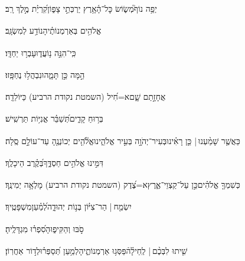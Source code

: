 \documentclass[12pt]{article}
\newcommand{\loc}[1]{\textsuperscript{\locf{#1}}}
\begin{document}
{\loc{ ג}~}‏יְפֵ֥ה נוֹף֮{\hfill}מְשׂ֢וֹשׂ כׇּל־הָ֫אָ֥רֶץ\newline\hspace*{.5em} יַרְכְּתֵ֣י צָפ֑וֹן{\hfill}קִ֝רְיַ֗ת מֶ֣לֶךְ רָֽב׃\par

{\loc{ ד}~}‏אֱלֹהִ֥ים בְּאַרְמְנוֹתֶ֗יהָ{\hfill}נוֹדַ֥ע לְמִשְׂגָּֽב׃\par

{\loc{ ה}~}‏כִּֽי־הִנֵּ֣ה  נ֥וֹעֲד֑וּ{\hfill}עָבְר֥וּ יַחְדָּֽו׃\par

{\loc{ ו}~}‏הֵ֣מָּה  כֵּ֣ן תָּמָ֑הוּ{\hfill}נִבְהֲל֥וּ נֶחְפָּֽזוּ׃\par

{\loc{ ז}~}‏ אֲחָזָ֣תַם שָׁ֑ם{\hfill}א=חִ֝יל (השמטת נקודת הרביע) כַּיּוֹלֵדָֽה׃\par

{\loc{ ח}~}‏בְּר֥וּחַ קָדִ֑ים{\hfill}תְּ֝שַׁבֵּ֗ר אֳנִיּ֥וֹת תַּרְשִֽׁישׁ׃\par

{\loc{ ט}~}‏כַּאֲשֶׁ֤ר שָׁמַ֨עְנוּ |  כֵּ֤ן רָאִ֗ינוּ{\hfill}בְּעִיר־יְהֹוָ֣ה \newline\hspace*{.5em}בְּעִ֣יר אֱלֹהֵ֑ינוּ{\hfill}אֱלֹ֘הִ֤ים יְכוֹנְנֶ֖הָ עַד־עוֹלָ֣ם סֶֽלָה׃\par

{\loc{ י}~}‏דִּמִּ֣ינוּ אֱלֹהִ֣ים חַסְדֶּ֑ךָ{\hfill}בְּ֝קֶ֗רֶב הֵיכָלֶֽךָ׃\par

{\loc{ יא}~}‏כְּשִׁמְךָ֤ אֱלֹהִ֗ים{\hfill}כֵּ֣ן \newline\hspace*{.5em}עַל־קַצְוֵי־אֶ֑רֶץ{\hfill}א=צֶ֝דֶק (השמטת נקודת הרביע) מָלְאָ֥ה יְמִינֶֽךָ׃\par

{\loc{ יב}~}‏יִשְׂמַ֤ח |  הַר־צִיּ֗וֹן{\hfill} בְּנ֣וֹת יְהוּדָ֑ה\newline\hspace*{.5em}לְ֝מַ֗עַן{\hfill}מִשְׁפָּטֶֽיךָ׃\par

{\loc{ יג}~}‏סֹ֣בּוּ  וְהַקִּיפ֑וּהָ{\hfill}סִ֝פְר֗וּ מִגְדָּלֶֽיהָ׃\par

{\loc{ יד}~}‏שִׁ֤יתוּ לִבְּכֶ֨ם |  לְֽחֵילָ֗הֿ{\hfill}פַּסְּג֥וּ אַרְמְנוֹתֶ֑יהָ\newline\hspace*{.5em}לְמַ֥עַן תְּ֝סַפְּר֗וּ{\hfill}לְד֣וֹר אַחֲרֽוֹן׃\par
\end{document}
